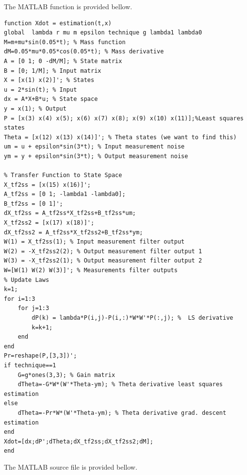 \documentclass[12pt]{article}
\begin{document}
The MATLAB function is provided bellow.
\begin{lstlisting}
function Xdot = estimation(t,x)
global  lambda r mu m epsilon technique g lambda1 lambda0
M=m+mu*sin(0.05*t); % Mass function
dM=0.05*mu*0.05*cos(0.05*t); % Mass derivative
A = [0 1; 0 -dM/M]; % State matrix
B = [0; 1/M]; % Input matrix
X = [x(1) x(2)]'; % States
u = 2*sin(t); % Input
dx = A*X+B*u; % State space 
y = x(1); % Output
P = [x(3) x(4) x(5); x(6) x(7) x(8); x(9) x(10) x(11)];%Least squares states
Theta = [x(12) x(13) x(14)]'; % Theta states (we want to find this)
um = u + epsilon*sin(3*t); % Input measurement noise
ym = y + epsilon*sin(3*t); % Output measurement noise

% Transfer Function to State Space
X_tf2ss = [x(15) x(16)]';
A_tf2ss = [0 1; -lambda1 -lambda0];
B_tf2ss = [0 1]';
dX_tf2ss = A_tf2ss*X_tf2ss+B_tf2ss*um;
X_tf2ss2 = [x(17) x(18)]';
dX_tf2ss2 = A_tf2ss*X_tf2ss2+B_tf2ss*ym;
W(1) = X_tf2ss(1); % Input measurement filter output
W(2) = -X_tf2ss2(2); % Output measurement filter output 1
W(3) = -X_tf2ss2(1); % Output measurement filter output 2
W=[W(1) W(2) W(3)]'; % Measurements filter outputs
% Update Laws
k=1;
for i=1:3
    for j=1:3
        dP(k) = lambda*P(i,j)-P(i,:)*W*W'*P(:,j); %  LS derivative
        k=k+1;
    end
end
Pr=reshape(P,[3,3])';
if technique==1
    G=g*ones(3,3); % Gain matrix
    dTheta=-G*W*(W'*Theta-ym); % Theta derivative least squares estimation
else
    dTheta=-Pr*W*(W'*Theta-ym); % Theta derivative grad. descent estimation
end
Xdot=[dx;dP';dTheta;dX_tf2ss;dX_tf2ss2;dM];
end
\end{lstlisting}
The MATLAB source file is provided bellow.
\end{document}
